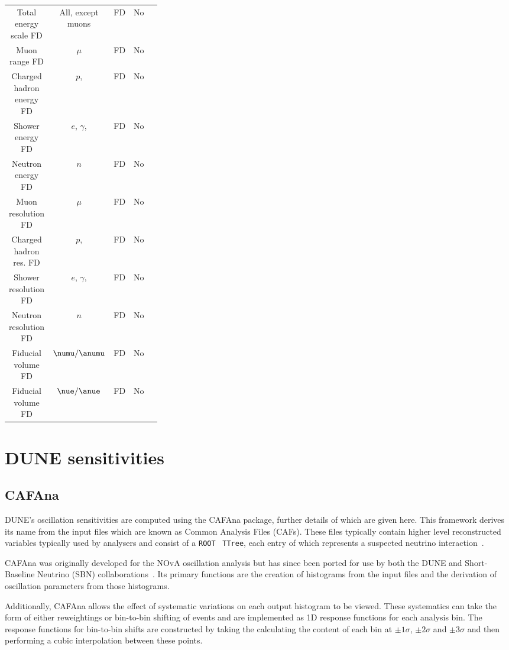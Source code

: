 \begin{table}
\begin{tabular}{c c c p{0.3\linewidth}}
		Total energy scale FD & All, except muons & FD & No \\
		Muon range FD & $\mu$ & FD & No \\
		Charged hadron energy FD & $p$, \pipm & FD & No \\
		Shower energy FD & $e$, $\gamma$, \pizero & FD & No \\
		Neutron energy FD & $n$ & FD & No \\
		Muon resolution FD & $\mu$ & FD & No \\
		Charged hadron res. FD & $p$, \pipm & FD & No \\		
		Shower resolution FD & $e$, $\gamma$, \pizero & FD & No\\
		Neutron resolution FD & $n$ & FD & No \\
		Fiducial volume \numu FD & $\numu / \anumu$ & FD & No \\
		Fiducial volume \nue FD & $\nue / \anue$ & FD & No \\
		\hline
	\end{tabular}
\end{table}

\section{DUNE sensitivities}
\label{sec:dune_lbl:sensitivities}

\subsection{CAFAna}
\label{sec:dune_lbl:sensitivities:cafana}

DUNE's oscillation sensitivities are computed using the CAFAna package, further details of which are given here.
This framework derives its name from the input files which are known as Common Analysis Files (CAFs).
These files typically contain higher level reconstructed variables typically used by analysers and consist of a \texttt{ROOT}~\cite{root} \texttt{TTree}, each entry of which represents a suspected neutrino interaction~\cite{backhouse2015}.

CAFAna was originally developed for the NOvA oscillation analysis but has since been ported for use by both the DUNE and Short-Baseline Neutrino (SBN) collaborations~\cite{cafana}.
Its primary functions are the creation of histograms from the input files and the derivation of oscillation parameters from those histograms.

Additionally, CAFAna allows the effect of systematic variations on each output histogram to be viewed. 
These systematics can take the form of either reweightings or bin-to-bin shifting of events and are implemented as 1D response functions for each analysis bin.
The response functions for bin-to-bin shifts are constructed by taking the calculating the content of each bin at $\pm 1 \sigma$, $\pm 2 \sigma$ and $\pm 3 \sigma$ and then performing a cubic interpolation between these points.

